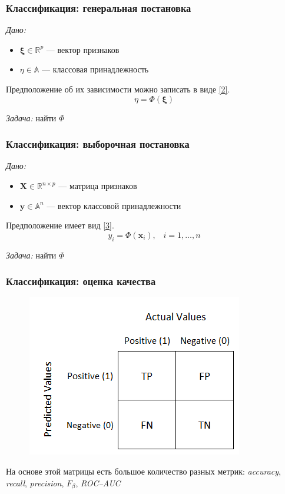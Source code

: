\documentclass[11pt]{beamer}
\begin{document}
	\begin{frame}
		\frametitle{Классификация: генеральная постановка}
		\textit{Дано:}
		\begin{itemize}
			\item $\bm{\xi} \in \mathbb{R}^p$ --- вектор признаков
			\item $\eta \in \mathbb{A}$ --- классовая принадлежность
		\end{itemize}
	
		Предположение об их зависимости можно записать в виде \ref{2}.
		\begin{equation}
			\eta = \Phi(\bm{\xi})
			\label{2}
		\end{equation}
		
		\textit{Задача:} найти $\Phi$
	\end{frame}

	\begin{frame}
		\frametitle{Классификация: выборочная постановка}
		\textit{Дано:}
		\begin{itemize}
			\item $\bm{X} \in \mathbb{R}^{n\times p}$ --- матрица признаков
			\item $\bm{y} \in \mathbb{A}^n$ --- вектор классовой принадлежности
		\end{itemize}
		
		Предположение имеет вид \ref{3}.
		\begin{equation}
			y_i = \Phi(\bm{x}_i),\;\;\; i = 1, \ldots, n
			\label{3}
		\end{equation}
		
		\textit{Задача:} найти $\Phi$
	\end{frame}

	\begin{frame}
		\frametitle{Классификация: оценка качества}
		\begin{figure}
			\includegraphics[width=0.3\linewidth]{../Report/imgs/conf_matrix}
		\end{figure}
	    На основе этой матрицы есть большое количество разных метрик: \textit{accuracy}, \textit{recall}, \textit{precision}, $F_\beta$, \textit{ROC--AUC}
	\end{frame}
\end{document}
